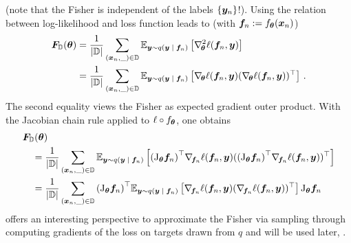 (note that the Fisher is independent of the labels $\{{\bm{y}}_n\}$!). Using the
relation between log-likelihood and loss function leads to (with ${\bm{f}}_n :=
f_{{\bm{\theta}}}({\bm{x}}_n)$)
\begin{align*}
  {\bm{F}}_{{\mathbb{D}}}({\bm{\theta}})
  &=
    \frac{1}{|{\mathbb{D}}|}
    \sum_{({\bm{x}}_n, \_) \in {\mathbb{D}}}
    \mathbb{E}_{{\bm{y}} \sim q({\bm{y}}\;|\;{\bm{f}}_n)}
    \left[
    \nabla_{\!{{\bm{\theta}}}}^{2} \ell({\bm{f}}_n, {\bm{y}})
    \right]
  \\
  &=
    \frac{1}{|{\mathbb{D}}|}
    \sum_{({\bm{x}}_n, \_) \in {\mathbb{D}}}
    \mathbb{E}_{{\bm{y}} \sim q({\bm{y}}\;|\;{\bm{f}}_n)}
    \left[
    \nabla_{\!{{\bm{\theta}}}} \ell({\bm{f}}_n, {\bm{y}})
    (\nabla_{\!{{\bm{\theta}}}} \ell({\bm{f}}_n, {\bm{y}}))^{\top}
    \right]\,.
\end{align*}
The second equality views the Fisher as expected gradient outer product. With
the Jacobian chain rule  applied to $\ell
\circ f_{{\bm{\theta}}}$, one obtains
\begin{align}
  \label{eq:background::FisherSamplingPerspective}
  \begin{split}
    &{\bm{F}}_{{\mathbb{D}}}({\bm{\theta}})
      \\
    &\quad=
      \frac{1}{|{\mathbb{D}}|}
      \sum_{({\bm{x}}_n, \_) \in {\mathbb{D}}}
      \mathbb{E}_{{\bm{y}} \sim q({\bm{y}}\;|\;{\bm{f}}_n)}
      \left[
      {(\mathrm{J}_{{\bm{\theta}}}{\bm{f}}_n)}^{\top}\nabla_{\!{{\bm{f}}_n}} \ell({\bm{f}}_n, {\bm{y}})
      ({(\mathrm{J}_{{\bm{\theta}}}{\bm{f}}_n)}^{\top}\nabla_{\!{{\bm{f}}_n}} \ell({\bm{f}}_n, {\bm{y}}))^{\top}
      \right]
    \\
    &\quad=
      \frac{1}{|{\mathbb{D}}|}
      \sum_{({\bm{x}}_n, \_) \in {\mathbb{D}}}
      {(\mathrm{J}_{{\bm{\theta}}}{\bm{f}}_n)}^{\top}
      \mathbb{E}_{{\bm{y}} \sim q({\bm{y}}\;|\;{\bm{f}}_n)}
      \left[
      \nabla_{\!{{\bm{f}}_n}} \ell({\bm{f}}_n, {\bm{y}})
      (\nabla_{\!{{\bm{f}}_n}} \ell({\bm{f}}_n, {\bm{y}}))^{\top}
      \right]
      \mathrm{J}_{{\bm{\theta}}}{\bm{f}}_n
  \end{split}
\end{align}
 offers an interesting
perspective to approximate the Fisher via \mc sampling through computing
gradients of the loss on targets drawn from $q$ and will be used later, \eg
{}.

